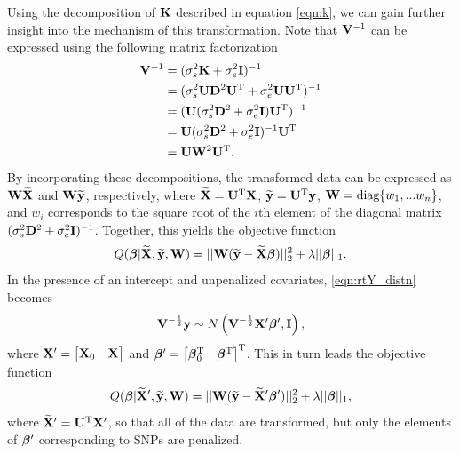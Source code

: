 Using the decomposition of $\mathbf{K}$ described in equation \eqref{eqn:k}, we can gain further insight into the mechanism of this transformation. Note that $\mathbf{V}^{-1}$ can be expressed using the following matrix factorization 
\begin{align*}
    \mathbf{V}^{-1} &= (\sigma^2_s \mathbf{K} + \sigma^2_e \mathbf{I})^{-1}\\
    &=(\sigma^2_s \mathbf{U} \mathbf{D}^2 \mathbf{U}^{\text{T}} + \sigma^2_e \mathbf{U} \mathbf{U}^{\text{T}})^{-1}\\
    &= (\mathbf{U} (\sigma^2_s \mathbf{D}^2 + \sigma^2_e \mathbf{I}) \mathbf{U}^{\text{T}})^{-1}\\
    &=\mathbf{U} (\sigma^2_s \mathbf{D}^2 + \sigma^2_e \mathbf{I})^{-1} \mathbf{U}^{\text{T}}\\
    &=\mathbf{U} \mathbf{W}^2 \mathbf{U}^{\text{T}}.
\end{align*}
By incorporating these decompositions, the transformed data can be expressed as $\mathbf{W} \widetilde{\mathbf{X}}$ and $\mathbf{W} \widetilde{\mathbf{y}}$, respectively, where $\widetilde{\mathbf{X}} = \mathbf{U}^{\text{T}} \mathbf{X}$, $\widetilde{\mathbf{y}} = \mathbf{U}^{\text{T}} \mathbf{y}$, $\mathbf{W} = \text{diag}\{w_1, ... w_n\}$, and $w_i$ corresponds to the square root of the $i$th element of the diagonal matrix $(\sigma^2_s \mathbf{D}^2 + \sigma^2_e \mathbf{I})^{-1}$. Together, this yields the objective function
\begin{equation}
\label{eqn:lmm_obj}
Q(\boldsymbol{\beta}{} | \widetilde{\mathbf{X}}, \widetilde{\mathbf{y}}, \mathbf{W}) = || \mathbf{W} (\widetilde{\mathbf{y}} - \widetilde{\mathbf{X}} \boldsymbol{\beta}{})||_2^2 + \lambda || \boldsymbol{\beta}{} ||_1.
\end{equation}
In the presence of an intercept and unpenalized covariates, \eqref{eqn:rtY_distn} becomes 
\begin{equation}
\mathbf{V}^{-\frac{1}{2}}\mathbf{y} \sim N\left(\mathbf{V}^{-\frac{1}{2}} \mathbf{X}{^\prime} \boldsymbol{\beta}{}{^\prime}, \mathbf{I} \right),
\end{equation}
where $\mathbf{X}{^\prime} = \begin{bmatrix} \mathbf{X}_0 & \mathbf{X} \end{bmatrix}$ and $\boldsymbol{\beta}{}{^\prime} = \begin{bmatrix} \boldsymbol{\beta}{}_0^{\text{T}} & \boldsymbol{\beta}{}^{\text{T}} \end{bmatrix}^{\text{T}}$. This in turn leads the objective function
\begin{equation}
Q(\boldsymbol{\beta}{} | \widetilde{\mathbf{X}}{^\prime}, \widetilde{\mathbf{y}}, \mathbf{W}) = || \mathbf{W} (\widetilde{\mathbf{y}} - \widetilde{\mathbf{X}}{^\prime} \boldsymbol{\beta}{}{^\prime})||_2^2 + \lambda || \boldsymbol{\beta}{} ||_1,
\end{equation}
where $\widetilde{\mathbf{X}}{^\prime} = \mathbf{U}^{\text{T}} \mathbf{X}{^\prime}$, so that all of the data are transformed, but only the elements of $\boldsymbol{\beta}{}{^\prime}$ corresponding to SNPs are penalized. 


